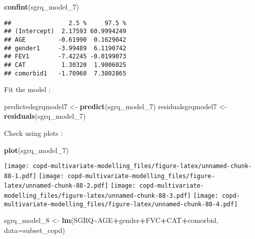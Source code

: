 \documentclass[
]{article}
\newenvironment{Shaded}{\begin{snugshade}}{\end{snugshade}}
\newcommand{\AttributeTok}[1]{\textcolor[rgb]{0.13,0.29,0.53}{#1}}
\newcommand{\FunctionTok}[1]{\textcolor[rgb]{0.13,0.29,0.53}{\textbf{#1}}}
\newcommand{\NormalTok}[1]{#1}
\newcommand{\OtherTok}[1]{\textcolor[rgb]{0.56,0.35,0.01}{#1}}
\newcommand{\SpecialCharTok}[1]{\textcolor[rgb]{0.81,0.36,0.00}{\textbf{#1}}}
\begin{document}
\begin{Shaded}
\begin{Highlighting}[]
\FunctionTok{confint}\NormalTok{(sgrq\_model\_7)}
\end{Highlighting}
\end{Shaded}

\begin{verbatim}
##                2.5 %     97.5 %
## (Intercept)  2.17593 60.9994249
## AGE         -0.61990  0.1629042
## gender1     -3.99489  6.1190742
## FEV1        -7.42245 -0.0199073
## CAT          1.30320  1.9006025
## comorbid1   -1.70960  7.3802865
\end{verbatim}

Fit the model :

\begin{Shaded}
\begin{Highlighting}[]
\NormalTok{predictedsgrqmodel7 }\OtherTok{\textless{}{-}} \FunctionTok{predict}\NormalTok{(sgrq\_model\_7)}
\NormalTok{residualsgrqmodel7 }\OtherTok{\textless{}{-}} \FunctionTok{residuals}\NormalTok{(sgrq\_model\_7)}
\end{Highlighting}
\end{Shaded}

Check using plots :

\begin{Shaded}
\begin{Highlighting}[]
\FunctionTok{plot}\NormalTok{(sgrq\_model\_7)}
\end{Highlighting}
\end{Shaded}

\texttt{[image: copd-multivariate-modelling\_files/figure-latex/unnamed-chunk-88-1.pdf]}
\texttt{[image: copd-multivariate-modelling\_files/figure-latex/unnamed-chunk-88-2.pdf]}
\texttt{[image: copd-multivariate-modelling\_files/figure-latex/unnamed-chunk-88-3.pdf]}
\texttt{[image: copd-multivariate-modelling\_files/figure-latex/unnamed-chunk-88-4.pdf]}

\begin{Shaded}
\begin{Highlighting}[]
\NormalTok{sgrq\_model\_8 }\OtherTok{\textless{}{-}} \FunctionTok{lm}\NormalTok{(SGRQ}\SpecialCharTok{\textasciitilde{}}\NormalTok{AGE}\SpecialCharTok{+}\NormalTok{gender}\SpecialCharTok{+}\NormalTok{FVC}\SpecialCharTok{+}\NormalTok{CAT}\SpecialCharTok{+}\NormalTok{comorbid, }\AttributeTok{data=}\NormalTok{subset\_copd)}
\end{Highlighting}
\end{Shaded}
\end{document}
